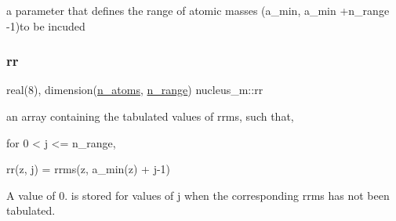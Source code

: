 a parameter that defines the range of atomic masses (a\+\_\+min, a\+\_\+min +n\+\_\+range -\/1)to be incuded 

\mbox{\label{namespacenucleus__m_aadb2a0e0828722e6e3f118cdf1b07f50}} 
\subsubsection{\texorpdfstring{rr}{rr}}
{\footnotesize\ttfamily real(8), dimension(\mbox{\hyperlink{namespacenucleus__m_a97ff520812e294bf26a6b2c330f211e5}{n\+\_\+atoms}}, \mbox{\hyperlink{namespacenucleus__m_adf953c9196f6870fe5e502b4f40bea48}{n\+\_\+range}}) nucleus\+\_\+m\+::rr}



an array containing the tabulated values of rrms, such that, 

\begin{DoxyVerb}  for 0 < j <= n_range,

  rr(z, j) = rrms(z, a_min(z) + j-1)
\end{DoxyVerb}


A value of 0. is stored for values of j when the corresponding rrms has not been tabulated. 